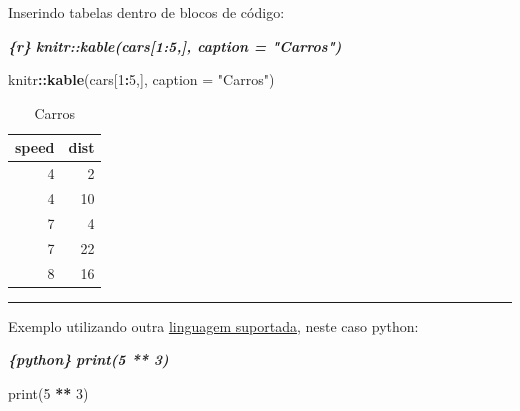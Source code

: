 \documentclass[
]{book}
\newenvironment{Shaded}{\begin{snugshade}}{\end{snugshade}}
\newcommand{\BuiltInTok}[1]{#1}
\newcommand{\DataTypeTok}[1]{\textcolor[rgb]{0.13,0.29,0.53}{#1}}
\newcommand{\DecValTok}[1]{\textcolor[rgb]{0.00,0.00,0.81}{#1}}
\newcommand{\InformationTok}[1]{\textcolor[rgb]{0.56,0.35,0.01}{\textbf{\textit{#1}}}}
\newcommand{\KeywordTok}[1]{\textcolor[rgb]{0.13,0.29,0.53}{\textbf{#1}}}
\newcommand{\NormalTok}[1]{#1}
\newcommand{\OperatorTok}[1]{\textcolor[rgb]{0.81,0.36,0.00}{\textbf{#1}}}
\newcommand{\StringTok}[1]{\textcolor[rgb]{0.31,0.60,0.02}{#1}}
\begin{document}
Inserindo tabelas dentro de blocos de código:

\begin{Shaded}
\begin{Highlighting}[]
\InformationTok{\textasciigrave{}\textasciigrave{}\textasciigrave{}\{r\}}
\InformationTok{knitr::kable(cars[1:5,], caption = "Carros")}
\InformationTok{\textasciigrave{}\textasciigrave{}\textasciigrave{}}
\end{Highlighting}
\end{Shaded}

\begin{Shaded}
\begin{Highlighting}[]
\NormalTok{knitr}\OperatorTok{::}\KeywordTok{kable}\NormalTok{(cars[}\DecValTok{1}\OperatorTok{:}\DecValTok{5}\NormalTok{,], }\DataTypeTok{caption =} \StringTok{"Carros"}\NormalTok{)}
\end{Highlighting}
\end{Shaded}

\begin{table}

\caption{\label{tab:unnamed-chunk-37}Carros}
\centering
\begin{tabular}[t]{r|r}
\hline
speed & dist\\
\hline
4 & 2\\
\hline
4 & 10\\
\hline
7 & 4\\
\hline
7 & 22\\
\hline
8 & 16\\
\hline
\end{tabular}
\end{table}

\begin{center}\rule{0.5\linewidth}{0.5pt}\end{center}

Exemplo utilizando outra \protect\hyperlink{linguagens-suportadas}{linguagem suportada}, neste caso python:

\begin{Shaded}
\begin{Highlighting}[]
\InformationTok{\textasciigrave{}\textasciigrave{}\textasciigrave{}\{python\}}
\InformationTok{print(5 ** 3)}
\InformationTok{\textasciigrave{}\textasciigrave{}\textasciigrave{}}
\end{Highlighting}
\end{Shaded}

\begin{Shaded}
\begin{Highlighting}[]
\BuiltInTok{print}\NormalTok{(}\DecValTok{5} \OperatorTok{**} \DecValTok{3}\NormalTok{)}
\end{Highlighting}
\end{Shaded}
\end{document}
